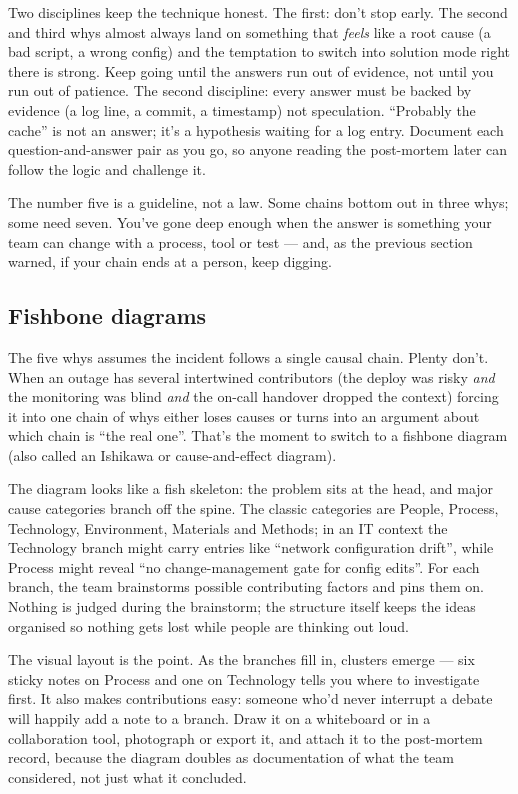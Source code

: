 Two disciplines keep the technique honest. The first: don't stop early. The second and third whys almost always land on something that \emph{feels} like a root cause (a bad script, a wrong config) and the temptation to switch into solution mode right there is strong. Keep going until the answers run out of evidence, not until you run out of patience. The second discipline: every answer must be backed by evidence (a log line, a commit, a timestamp) not speculation. ``Probably the cache'' is not an answer; it's a hypothesis waiting for a log entry. Document each question-and-answer pair as you go, so anyone reading the post-mortem later can follow the logic and challenge it.


The number five is a guideline, not a law. Some chains bottom out in three whys; some need seven. You've gone deep enough when the answer is something your team can change with a process, tool or test — and, as the previous section warned, if your chain ends at a person, keep digging.



\subsection{Fishbone diagrams}


The five whys assumes the incident follows a single causal chain. Plenty don't. When an outage has several intertwined contributors (the deploy was risky \emph{and} the monitoring was blind \emph{and} the on-call handover dropped the context) forcing it into one chain of whys either loses causes or turns into an argument about which chain is ``the real one''. That's the moment to switch to a fishbone diagram (also called an Ishikawa or cause-and-effect diagram).


The diagram looks like a fish skeleton: the problem sits at the head, and major cause categories branch off the spine. The classic categories are People, Process, Technology, Environment, Materials and Methods; in an IT context the Technology branch might carry entries like ``network configuration drift'', while Process might reveal ``no change-management gate for config edits''. For each branch, the team brainstorms possible contributing factors and pins them on. Nothing is judged during the brainstorm; the structure itself keeps the ideas organised so nothing gets lost while people are thinking out loud.


The visual layout is the point. As the branches fill in, clusters emerge — six sticky notes on Process and one on Technology tells you where to investigate first. It also makes contributions easy: someone who'd never interrupt a debate will happily add a note to a branch. Draw it on a whiteboard or in a collaboration tool, photograph or export it, and attach it to the post-mortem record, because the diagram doubles as documentation of what the team considered, not just what it concluded.



